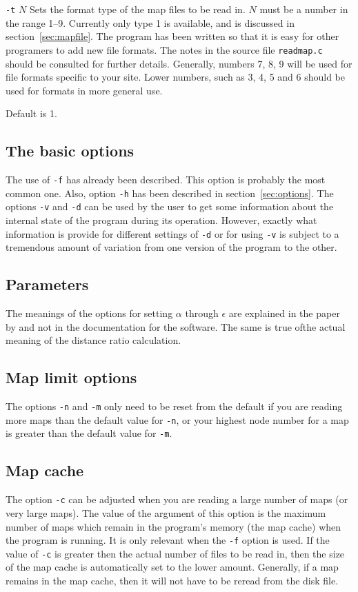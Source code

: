 \documentclass[%
	11pt,
        a4paper,
        twoside]{workrep}
\newcommand*{\file}[1]{\texttt{#1}}		%
\newcommand*{\opt}[1]{\texttt{#1}}		%
\newlength{\lentrylen}
\newcommand{\lentrylabel}[1]{%
   \settowidth{\lentrylen}{#1}%
   \ifthenelse{\lengthtest{\lentrylen > \labelwidth}}%
      {\parbox[b]{\labelwidth}{\makebox[0pt][l]{#1}\\}}%
      {#1}%
   \hfil\relax}
\newenvironment{optlist}[1][35pt]
    {\renewcommand{\entrylabel}{\lentrylabel}\begin{entry}[#1]}
    {\end{entry}}
\newenvironment{entry}[1][35pt]
  {\begin{list}{}%
    {\renewcommand{\makelabel}{\entrylabel}%
      \setlength{\labelwidth}{#1}%
      \setlength{\leftmargin}{\labelwidth}%
      \addtolength{\leftmargin}{\labelsep}}}
  {\end{list}}
\newcommand{\entrylabel}[1]{\mbox{\textsf{#1:}}\hfil}
\begin{document}
\begin{optlist}
\item[\texttt{-t} $N$]
	Sets the format type of the map files to be read in.
	$N$ must be a number in the range 1--9.  Currently
	only type 1 is available, and is discussed in
	section~\ref{sec:mapfile}.  The program
	has been written so that it is easy for other programers
	to add new file formats.  The notes in the source
	file \file{readmap.c} should be consulted for further details.
	Generally, numbers 7, 8, 9 will be used for file
	formats specific to your site.  Lower numbers, such as
	3, 4, 5 and 6 should be used for formats in more
	general use.

	Default is 1.
\end{optlist}

\subsection{The basic options}

The use of \opt{-f} has already been described.  This option is
probably the most common one.  Also, option \opt{-h} has been described
in section~\ref{sec:options}.  The options \opt{-v} and \opt{-d} can
be used by the user to get some information about the internal state
of the program during its operation.  However, exactly what information
is provide for different settings of \opt{-d} or for using \opt{-v}
is subject to a tremendous amount of variation from one version of
the program to the other.

\subsection{Parameters}

The meanings of the options for setting $\alpha$ through $\epsilon$ are
explained in the paper by  and not
in the documentation for the software.  The same is true ofthe
actual meaning of the distance ratio calculation.

\subsection{Map limit options}
The options \opt{-n} and \opt{-m} only need to be reset from the default
if you are reading more maps than the default value for \opt{-n},
or your highest node number for a map is greater than the default
value for \opt{-m}.

\subsection{Map cache}
The option \opt{-c} can be adjusted when you are reading a large
number of maps (or very large maps).  The value of the argument of
this option is the maximum number of maps which remain in the program's
memory (the map cache) when the program is running.  It is only relevant
when the \opt{-f} option is used.  If the value of \opt{-c} is
greater then the actual number of files to be read in, then the
size of the map cache is automatically set to the lower amount.
Generally, if a map remains in the map cache, then it will not
have to be reread from the disk file.
\end{document}
